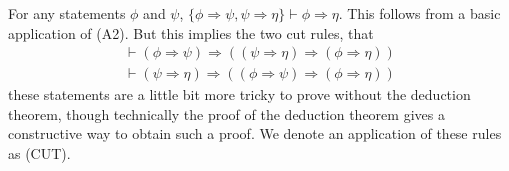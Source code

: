 \begin{example}
    For any statements $\phi$ and $\psi$, $\{ \phi \Rightarrow \psi, \psi \Rightarrow \eta \} \vdash \phi \Rightarrow \eta$. This follows from a basic application of (A2). But this implies the two cut rules, that
    \begin{gather*}
        \vdash (\phi \Rightarrow \psi) \Rightarrow ((\psi \Rightarrow \eta) \Rightarrow (\phi \Rightarrow \eta))\\
        \vdash (\psi \Rightarrow \eta) \Rightarrow ((\phi \Rightarrow \psi) \Rightarrow (\phi \Rightarrow \eta))
    \end{gather*}
    these statements are a little bit more tricky to prove without the deduction theorem, though technically the proof of the deduction theorem gives a constructive way to obtain such a proof. We denote an application of these rules as (CUT).
\end{example}

